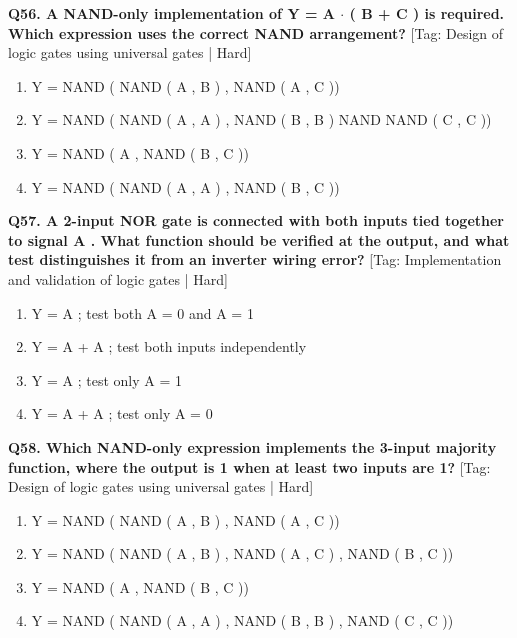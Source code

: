 \noindent\textbf{Q56. A NAND-only implementation of Y = A $\cdot$ ( B + C ) is required. Which expression uses the correct NAND arrangement?} \hfill [Tag: Design of logic gates using universal gates | Hard]
\begin{enumerate}[label=(\alph*),topsep=2pt,itemsep=1pt,partopsep=0pt,parsep=0pt]
    \item {Y = NAND ( NAND ( A , B ) , NAND ( A , C ))}
    \item {Y = NAND ( NAND ( A , A ) , NAND ( B , B ) NAND NAND ( C , C ))}
    \item {Y = NAND ( A , NAND ( B , C ))}
    \item {Y = NAND ( NAND ( A , A ) , NAND ( B , C ))}
\end{enumerate}
\vspace{2mm}

\noindent\textbf{Q57. A 2-input NOR gate is connected with both inputs tied together to signal A . What function should be verified at the output, and what test distinguishes it from an inverter wiring error?} \hfill [Tag: Implementation and validation of logic gates | Hard]
\begin{enumerate}[label=(\alph*),topsep=2pt,itemsep=1pt,partopsep=0pt,parsep=0pt]
    \item {Y = A ; test both A = 0 and A = 1}
    \item {Y = A + A ; test both inputs independently}
    \item {Y = A ; test only A = 1}
    \item {Y = A + A ; test only A = 0}
\end{enumerate}
\vspace{2mm}

\noindent\textbf{Q58. Which NAND-only expression implements the 3-input majority function, where the output is 1 when at least two inputs are 1?} \hfill [Tag: Design of logic gates using universal gates | Hard]
\begin{enumerate}[label=(\alph*),topsep=2pt,itemsep=1pt,partopsep=0pt,parsep=0pt]
    \item {Y = NAND ( NAND ( A , B ) , NAND ( A , C ))}
    \item {Y = NAND ( NAND ( A , B ) , NAND ( A , C ) , NAND ( B , C ))}
    \item {Y = NAND ( A , NAND ( B , C ))}
    \item {Y = NAND ( NAND ( A , A ) , NAND ( B , B ) , NAND ( C , C ))}
\end{enumerate}
\vspace{2mm}

